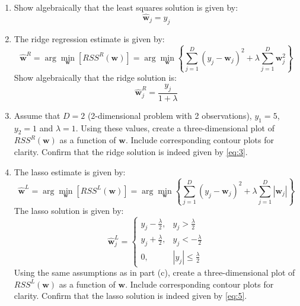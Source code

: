 \documentclass[11pt,twoside]{article}
\newcommand{\pts}[1]{\marginpar{ \small\hspace{0pt} \textit{[#1]} } }
\newcommand{\lt}{\left}
\newcommand{\rt}{\right}
\newcommand{\?}{\stackrel{?}{=}}
\newcommand{\fr}{\frac}
\newcommand{\la}{\lambda}
\begin{document}
\begin{enumerate}[\bf (a)]
\item Show algebraically  that the least squares solution is given by: \pts{3}
  \begin{equation}
    \label{eq:1}
    \hat{\bm w}_{j} = y_{j}
  \end{equation}
\item The ridge regression estimate is given by: \pts{5}
  \begin{equation}
    \label{eq:2}
    \hat{\bm w}^{R} = \arg\min_{{\bm w}}\lt[RSS^{R}({\bm w})\rt] = \arg\min_{{\bm w}}\lt\{\sum_{j=1}^{D} (y_{j} - {\bm w}_{j})^{2} + \la\sum_{j=1}^{D}{\bm w}_{j}^{2}\rt\}
  \end{equation}
  Show algebraically that the ridge solution is:
  \begin{equation}
    \label{eq:3}
    \hat{\bm w}_{j}^{R} = \fr{y_{j}}{1 + \la}
  \end{equation}
  


\item Assume that $D=2$ (2-dimensional problem with 2 observations), $y_{1}=5$, $y_{2}=1$ and $\lambda =1$. Using these values, create a three-dimensional plot of
  $RSS^{R}({\bm w})$ \pts{3} as a function of ${\bm w}$. Include corresponding contour plots for clarity.
  Confirm that the ridge solution is indeed given by \eqref{eq:3}.


\item  The lasso estimate is given by: \pts{3}
  \begin{equation}
    \label{eq:4}
    \hat{\bm w}^{L} = \arg\min_{{\bm w}}\lt[RSS^{L}({\bm w})\rt]
    = \arg\min_{{\bm w}}\lt\{\sum_{j=1}^{D} (y_{j} - {\bm w}_{j})^{2} + \la\sum_{j=1}^{D}|{\bm w}_{j}|\rt\}
  \end{equation}
  The lasso solution is given by:
  \begin{equation}
    \label{eq:5}
    \hat{\bm w}_{j}^{L} =
    \begin{cases}
      y_{j} - \fr\la2, & y_{j} > \fr\la2 \\
      y_{j} + \fr\la2, & y_{j} < -\fr\la2 \\
      0,               & |y_{j}| \le \fr\la2              
    \end{cases}
  \end{equation}
 Using the same assumptions as in part (c), create a three-dimensional plot of $RSS^{L}({\bm w})$  
  as a function of ${\bm w}$. Include corresponding contour plots for clarity.
  Confirm that the lasso solution is indeed given by \eqref{eq:5}.


\end{enumerate}
\end{document}
